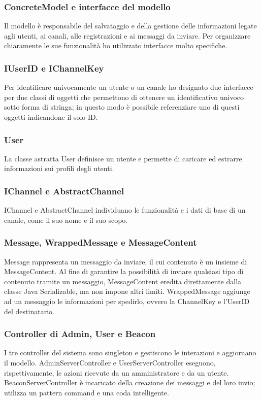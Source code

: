 		\subsubsection{ConcreteModel e interfacce del modello}
	Il modello è responsabile del salvataggio e della gestione delle informazioni legate agli utenti, ai canali, alle registrazioni e ai messaggi da inviare. Per organizzare chiaramente le sue funzionalità ho utilizzato interfacce molto specifiche.

		\subsubsection{IUserID e IChannelKey}
	Per identificare univocamente un utente o un canale ho designato due interfacce per due classi di oggetti che permettono di ottenere un identificativo univoco sotto forma di stringa; in questo modo è possibile referenziare uno di questi oggetti indicandone il solo ID.\@

		\subsubsection{User}
	La classe astratta User definisce un utente e permette di caricare ed estrarre informazioni sui profili degli utenti.

		\subsubsection{IChannel e AbstractChannel}
	IChannel e AbstractChannel individuano le funzionalità e i dati di base di un canale, come il suo nome e il suo scopo.

		\subsubsection{Message, WrappedMessage e MessageContent}
	Message rappresenta un messaggio da inviare, il cui contenuto è un insieme di MessageContent. Al fine di garantire la possibilità di inviare qualsiasi tipo di contenuto tramite un messaggio, MessageContent eredita direttamente dalla classe Java Serializable, ma non impone altri limiti. WrappedMessage aggiunge ad un messaggio le informazioni per spedirlo, ovvero la ChannelKey e l'UserID del destinatario.

		\subsubsection{Controller di Admin, User e Beacon}
	I tre controller del sistema sono singleton e gestiscono le interazioni e aggiornano il modello. AdminServerController e UserServerController eseguono, rispettivamente, le azioni ricevute da un amministratore e da un utente. BeaconServerController è incaricato della creazione dei messaggi e del loro invio; utilizza un pattern command e una coda intelligente.

